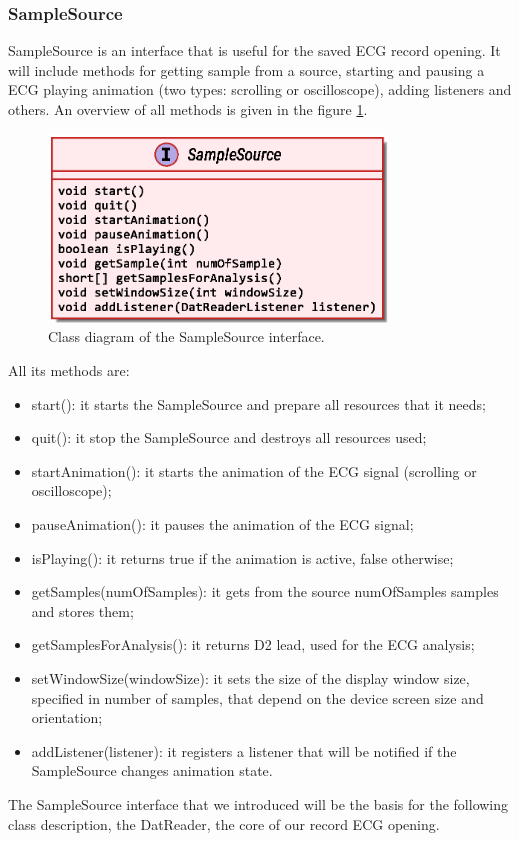 \subsubsection{SampleSource}
SampleSource is an interface that is useful for the saved ECG record opening. It will include methods for getting sample from a source, starting and pausing a ECG playing animation (two types: scrolling or oscilloscope), adding listeners and others. An overview of all methods is given in the figure \ref{fig9.1}.
\begin{figure}[ht!]
	\centering
	\includegraphics[width=90mm]{figures/ch9/1.eps}
	\caption{Class diagram of the SampleSource interface.}
	\label{fig9.1}
\end{figure}
All its methods are:
\begin{itemize}
	\item start(): it starts the SampleSource and prepare all resources that it needs;
	\item quit(): it stop the SampleSource and destroys all resources used;
	\item startAnimation(): it starts the animation of the ECG signal (scrolling or oscilloscope);
	\item pauseAnimation(): it pauses the animation of the ECG signal;
	\item isPlaying(): it returns true if the animation is active, false otherwise;
	\item getSamples(numOfSamples): it gets from the source numOfSamples samples and stores them;
	\item getSamplesForAnalysis(): it returns D2 lead, used for the ECG analysis;
	\item setWindowSize(windowSize): it sets the size of the display window size, specified in number of samples, that depend on the device screen size and orientation;
	\item addListener(listener): it registers a listener that will be notified if the SampleSource changes animation state.
\end{itemize}
The SampleSource interface that we introduced will be the basis for the following class description, the DatReader, the core of our record ECG opening.

